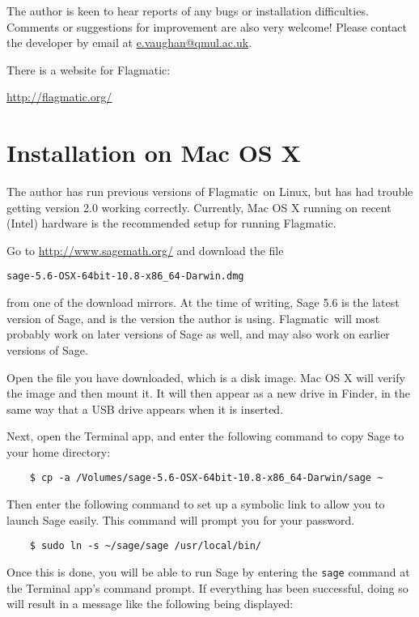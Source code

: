 \documentclass{article}
\providecommand{\flagmatic}{Flagmatic}
\begin{document}
The author is keen to hear reports of any bugs or installation difficulties. Comments or suggestions for improvement are also very welcome! Please contact the developer by email at \url{e.vaughan@qmul.ac.uk}.

There is a website for \flagmatic:

\url{http://flagmatic.org/}


\section{Installation on Mac OS X}

The author has run previous versions of \flagmatic\ on Linux, but has had trouble getting version 2.0 working correctly. Currently, Mac OS X running on recent (Intel) hardware is the recommended setup for running \flagmatic.

Go to \url{http://www.sagemath.org/} and download the file 

\begin{center}
\verb|sage-5.6-OSX-64bit-10.8-x86_64-Darwin.dmg|
\end{center}

from one of the download mirrors. At the time of writing, Sage 5.6 is the latest version of Sage, and is the version the author is using. \flagmatic\ will most probably work on later versions of Sage as well, and may also work on earlier versions of Sage.

Open the file you have downloaded, which is a disk image. Mac OS X will verify the image and then mount it. It will then appear as a new drive in Finder, in the same way that a USB drive appears when it is inserted.

Next, open the Terminal app, and enter the following command to copy Sage to your home directory:

\begin{verbatim}
    $ cp -a /Volumes/sage-5.6-OSX-64bit-10.8-x86_64-Darwin/sage ~
\end{verbatim}

Then enter the following command to set up a symbolic link to allow you to launch Sage easily. This command will prompt you for your password.

\begin{verbatim}
    $ sudo ln -s ~/sage/sage /usr/local/bin/
\end{verbatim}

Once this is done, you will be able to run Sage by entering the \verb|sage| command at the Terminal app's command prompt. If everything has been successful, doing so will result in a message like the following being displayed:
\end{document}
